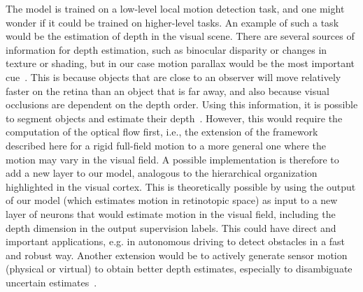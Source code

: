 \documentclass[default]{sn-jnl}%
\theoremstyle{thmstyleone}%
\theoremstyle{thmstyletwo}%
\theoremstyle{thmstylethree}%
\begin{document}
The model is trained on a low-level local motion detection task, and one might wonder if it could be trained on higher-level tasks. An example of such a task would be the estimation of depth in the visual scene. There are several sources of information for depth estimation, such as binocular disparity or changes in texture or shading, but in our case motion parallax would be the most important cue~\citep{rogers_motion_1979}. This is because objects that are close to an observer will move relatively faster on the retina than an object that is far away, and also because visual occlusions are dependent on the depth order. Using this information, it is possible to segment objects and estimate their depth~\citep{yoonessi_contribution_2011}. However, this would require the computation of the optical flow first, i.e., the extension of the framework described here for a rigid full-field motion to a more general one where the motion may vary in the visual field. A possible implementation is therefore to add a new layer to our model, analogous to the hierarchical organization highlighted in the visual cortex. This is theoretically possible by using the output of our model (which estimates motion in retinotopic space) as input to a new layer of neurons that would estimate motion in the visual field, including the depth dimension in the output supervision labels. This could have direct and important applications, e.g. in autonomous driving to detect obstacles in a fast and robust way. Another extension would be to actively generate sensor motion (physical or virtual) to obtain better depth estimates, especially to disambiguate uncertain estimates~\citep{nawrot_eye_2003}.
\end{document}
